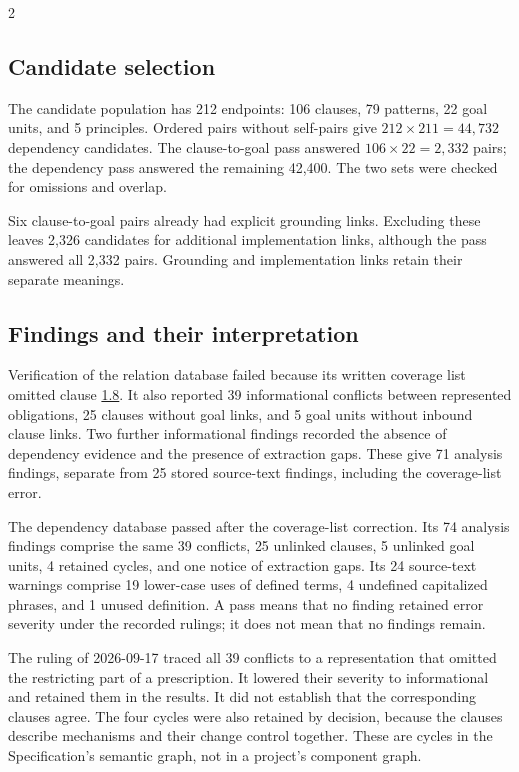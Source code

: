 \begin{multicols}{2}
\subsection{Candidate selection}

The candidate population has 212 endpoints: 106 clauses, 79 patterns, 22 goal units, and 5 principles. Ordered pairs without self-pairs give $212 \times 211 = 44{,}732$ dependency candidates. The clause-to-goal pass answered $106 \times 22 = 2{,}332$ pairs; the dependency pass answered the remaining 42,400. The two sets were checked for omissions and overlap.

Six clause-to-goal pairs already had explicit grounding links. Excluding these leaves 2,326 candidates for additional implementation links, although the pass answered all 2,332 pairs. Grounding and implementation links retain their separate meanings.

\subsection{Findings and their interpretation}

Verification of the relation database failed because its written coverage list omitted clause \hyperlink{nss-1.8}{1.8}. It also reported 39 informational conflicts between represented obligations, 25 clauses without goal links, and 5 goal units without inbound clause links. Two further informational findings recorded the absence of dependency evidence and the presence of extraction gaps. These give 71 analysis findings, separate from 25 stored source-text findings, including the coverage-list error.

The dependency database passed after the coverage-list correction. Its 74 analysis findings comprise the same 39 conflicts, 25 unlinked clauses, 5 unlinked goal units, 4 retained cycles, and one notice of extraction gaps. Its 24 source-text warnings comprise 19 lower-case uses of defined terms, 4 undefined capitalized phrases, and 1 unused definition. A pass means that no finding retained error severity under the recorded rulings; it does not mean that no findings remain.

The ruling of 2026-09-17 traced all 39 conflicts to a representation that omitted the restricting part of a prescription. It lowered their severity to informational and retained them in the results. It did not establish that the corresponding clauses agree. The four cycles were also retained by decision, because the clauses describe mechanisms and their change control together. These are cycles in the Specification's semantic graph, not in a project's component graph.


\end{multicols}
